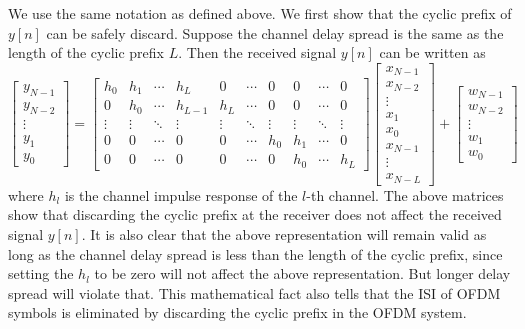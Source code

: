 We use the same notation as defined above. We first show that the cyclic prefix of $y[n]$ can be safely discard. Suppose the channel delay spread is the same as the length of the cyclic prefix $L$. Then the received signal $y[n]$ can be written as
\begin{equation}
    \label{eq:circ_conv}
    \begin{bmatrix}
        y_{N-1} \\ y_{N-2} \\ \vdots \\ y_1 \\ y_0
    \end{bmatrix}
    =
    \begin{bmatrix}
        h_0 & h_1 & \cdots & h_{L} & 0 & \cdots & 0 & 0 & \cdots & 0 \\
        0 & h_0 & \cdots & h_{L-1} & h_{L} & \cdots & 0 & 0 & \cdots & 0 \\
        \vdots & \vdots & \ddots & \vdots & \vdots & \ddots & \vdots & \vdots & \ddots & \vdots \\
        0 & 0 & \cdots & 0 & 0 & \cdots & h_0 & h_1 & \cdots & 0 \\
        0 & 0 & \cdots & 0 & 0 & \cdots & 0 & h_0 & \cdots & h_{L}
    \end{bmatrix}
    \begin{bmatrix}
        x_{N-1} \\ x_{N-2} \\ \vdots \\ x_1 \\ x_0 \\ x_{N-1} \\ \vdots \\ x_{N-L}
    \end{bmatrix}
    +
    \begin{bmatrix}
        w_{N-1} \\ w_{N-2} \\ \vdots \\ w_1 \\ w_0
    \end{bmatrix}
\end{equation}
where $h_l$ is the channel impulse response of the $l$-th channel. The above matrices show that discarding the cyclic prefix at the receiver does not affect the received signal $y[n]$. It is also clear that the above representation will remain valid as long as the channel delay spread is less than the length of the cyclic prefix, since setting the $h_l$ to be zero will not affect the above representation. But longer delay spread will violate that. This mathematical fact also tells that the ISI of OFDM symbols is eliminated by discarding the cyclic prefix in the OFDM system.

